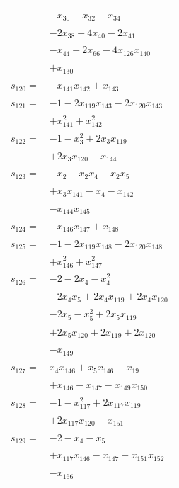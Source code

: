 \begin{longtable}{@{}r@{\;}l@{}}
 & \(\displaystyle -x_{30} -x_{32} -x_{34}\) \\
 & \(\displaystyle -2x_{38} -4x_{40} -2x_{41}\) \\
 & \(\displaystyle -x_{44} -2x_{66} -4x_{126}x_{140}\) \\
 & \(\displaystyle +x_{130}\) \\[3pt]
\(s_{120}=\) & \(\displaystyle -x_{141}x_{142} +x_{143}\) \\[3pt]
\(s_{121}=\) & \(\displaystyle -1 -2x_{119}x_{143} -2x_{120}x_{143}\) \\
 & \(\displaystyle +x_{141}^{2} +x_{142}^{2}\) \\[3pt]
\(s_{122}=\) & \(\displaystyle -1 -x_{3}^{2} +2x_{3}x_{119}\) \\
 & \(\displaystyle +2x_{3}x_{120} -x_{144}\) \\[3pt]
\(s_{123}=\) & \(\displaystyle -x_{2} -x_{2}x_{4} -x_{2}x_{5}\) \\
 & \(\displaystyle +x_{3}x_{141} -x_{4} -x_{142}\) \\
 & \(\displaystyle -x_{144}x_{145}\) \\[3pt]
\(s_{124}=\) & \(\displaystyle -x_{146}x_{147} +x_{148}\) \\[3pt]
\(s_{125}=\) & \(\displaystyle -1 -2x_{119}x_{148} -2x_{120}x_{148}\) \\
 & \(\displaystyle +x_{146}^{2} +x_{147}^{2}\) \\[3pt]
\(s_{126}=\) & \(\displaystyle -2 -2x_{4} -x_{4}^{2}\) \\
 & \(\displaystyle -2x_{4}x_{5} +2x_{4}x_{119} +2x_{4}x_{120}\) \\
 & \(\displaystyle -2x_{5} -x_{5}^{2} +2x_{5}x_{119}\) \\
 & \(\displaystyle +2x_{5}x_{120} +2x_{119} +2x_{120}\) \\
 & \(\displaystyle -x_{149}\) \\[3pt]
\(s_{127}=\) & \(\displaystyle x_{4}x_{146} +x_{5}x_{146} -x_{19}\) \\
 & \(\displaystyle +x_{146} -x_{147} -x_{149}x_{150}\) \\[3pt]
\(s_{128}=\) & \(\displaystyle -1 -x_{117}^{2} +2x_{117}x_{119}\) \\
 & \(\displaystyle +2x_{117}x_{120} -x_{151}\) \\[3pt]
\(s_{129}=\) & \(\displaystyle -2 -x_{4} -x_{5}\) \\
 & \(\displaystyle +x_{117}x_{146} -x_{147} -x_{151}x_{152}\) \\
 & \(\displaystyle -x_{166}\) \\[3pt]

\end{longtable}

